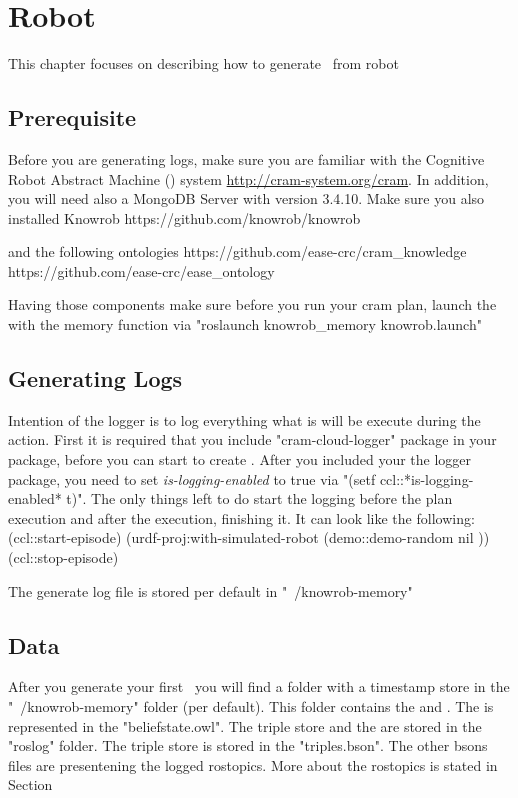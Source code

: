 \chapter{Robot \neems}

This chapter focuses on describing how to generate \neems~from robot 

\section{Prerequisite}

Before you are generating logs, make sure you are familiar with the Cognitive Robot Abstract Machine (\cram) system \url{http://cram-system.org/cram}.
In addition, you will need also a MongoDB Server with version 3.4.10.
Make sure you also installed Knowrob
https://github.com/knowrob/knowrob

and the following ontologies
https://github.com/ease-crc/cram\_knowledge
https://github.com/ease-crc/ease\_ontology

Having those components make sure before you run your cram plan, launch the \knowrob with the memory function via "roslaunch knowrob\_memory knowrob.launch"



\section{Generating Logs}
Intention of the logger is to log everything what is will be execute during the \cram action.
First it is required that you include "cram-cloud-logger" package in your \cram package, before you can start to create \neems.
After you included your the logger package, you need to set \textit{is-logging-enabled} to true via "(setf ccl::*is-logging-enabled* t)".
The only things left to do start the logging before the plan execution and after the execution, finishing it.
It can look like the following:
	(ccl::start-episode)
	(urdf-proj:with-simulated-robot (demo::demo-random nil ))
	(ccl::stop-episode)
	
The generate log file is stored per default in "~/knowrob-memory" 

\section{Data}
After you generate your first \neem~you will find a folder with a timestamp store in the "~/knowrob-memory" folder (per default).
This folder contains the \neemnar and \neemexp . The \neemnar is represented in the "beliefstate.owl". The triple store and the \neemexp are stored in the "roslog" folder. The triple store is stored in the "triples.bson". The other bsons files are presentening the logged rostopics. More about the rostopics is stated in Section 

